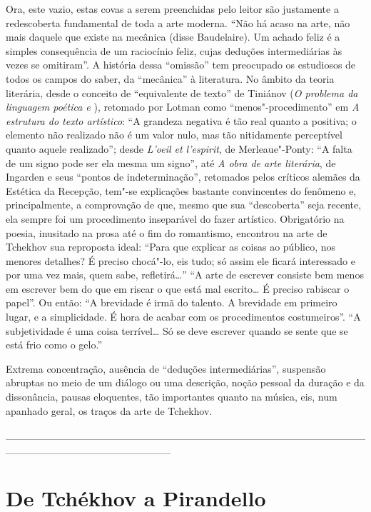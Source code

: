 Ora, este vazio, estas covas a serem preenchidas pelo leitor são
justamente a redescoberta fundamental de toda a arte moderna. ``Não há
acaso na arte, não mais daquele que existe na mecânica (disse
Baudelaire). Um achado feliz é a simples consequência de um raciocínio
feliz, cujas deduções intermediárias às vezes se omitiram''. A história
dessa ``omissão'' tem preocupado os estudiosos de todos os campos do
saber, da ``mecânica'' à literatura. No âmbito da teoria literária,
desde o conceito de ``equivalente de texto'' de Tiniánov (\emph{O
problema da linguagem poética  e }), retomado por Lotman como
``menos"-procedimento'' em \emph{A estrutura do texto artístico}: ``A
grandeza negativa é tão real quanto a positiva; o elemento não realizado
não é um valor nulo, mas tão nitidamente perceptível quanto aquele
realizado''; desde \emph{L'oeil et l'espirit}, de Merleaue"-Ponty: ``A
falta de um signo pode ser ela mesma um signo'', até \emph{A obra de
arte literária}, de Ingarden e seus ``pontos de indeterminação'',
retomados pelos críticos alemães da Estética da Recepção, tem"-se
explicações bastante convincentes do fenômeno e, principalmente, a
comprovação de que, mesmo que sua ``descoberta'' seja recente, ela
sempre foi um procedimento inseparável do fazer artístico. Obrigatório
na poesia, inusitado na prosa até o fim do romantismo, encontrou na arte
de Tchekhov sua reproposta ideal: ``Para que explicar as coisas ao
público, nos menores detalhes? É preciso chocá"-lo, eis tudo; só assim
ele ficará interessado e por uma vez mais, quem sabe, refletirá\ldots{}'' ``A
arte de escrever consiste bem menos em escrever bem do que em riscar o
que está mal escrito\ldots{} É preciso rabiscar o papel''. Ou então: ``A
brevidade é irmã do talento. A brevidade em primeiro lugar, e a
simplicidade. É hora de acabar com os procedimentos costumeiros''. ``A
subjetividade é uma coisa terrível\ldots{} Só se deve escrever quando se
sente que se está frio como o gelo.''

Extrema concentração, ausência de ``deduções intermediárias'', suspensão
abruptas no meio de um diálogo ou uma descrição, noção pessoal da
duração e da dissonância, pausas eloquentes, tão importantes quanto na
música, eis, num apanhado geral, os traços da arte de Tchekhov.

\_\_\_\_\_\_\_\_\_\_\_\_\_\_\_\_\_\_\_\_\_\_\_\_\_\_\_\_\_\_\_\_\_\_\_\_\_\_\_\_\_\_\_\_\_\_\_\_\_\_\_\_\_\_\_\_\_\_\_\_\_\_\_\_\_\_\_\_\_\_

\chapter{De Tchékhov a Pirandello}

